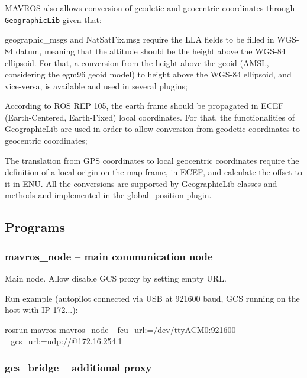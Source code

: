 M\+A\+V\+R\+OS also allows conversion of geodetic and geocentric coordinates through \href{https://geographiclib.sourceforge.io/}{\texttt{ Geographic\+Lib}} given that\+:
\begin{DoxyItemize}
\item {\ttfamily geographic\+\_\+msgs} and {\ttfamily Nat\+Sat\+Fix.\+msg} require the L\+LA fields to be filled in W\+G\+S-\/84 datum, meaning that the altitude should be the height above the W\+G\+S-\/84 ellipsoid. For that, a conversion from the height above the geoid (A\+M\+SL, considering the egm96 geoid model) to height above the W\+G\+S-\/84 ellipsoid, and vice-\/versa, is available and used in several plugins;
\item According to R\+OS R\+EP 105, the {\ttfamily earth} frame should be propagated in E\+C\+EF (Earth-\/\+Centered, Earth-\/\+Fixed) local coordinates. For that, the functionalities of Geographic\+Lib are used in order to allow conversion from geodetic coordinates to geocentric coordinates;
\item The translation from G\+PS coordinates to local geocentric coordinates require the definition of a local origin on the {\ttfamily map} frame, in E\+C\+EF, and calculate the offset to it in E\+NU. All the conversions are supported by Geographic\+Lib classes and methods and implemented in the {\ttfamily global\+\_\+position} plugin.
\end{DoxyItemize}

\subsection*{Programs }

\subsubsection*{mavros\+\_\+node -- main communication node}

Main node. Allow disable G\+CS proxy by setting empty U\+RL.

Run example (autopilot connected via U\+SB at 921600 baud, G\+CS running on the host with IP 172...)\+: \begin{DoxyVerb}rosrun mavros mavros_node _fcu_url:=/dev/ttyACM0:921600 _gcs_url:=udp://@172.16.254.1
\end{DoxyVerb}


\subsubsection*{gcs\+\_\+bridge -- additional proxy}

